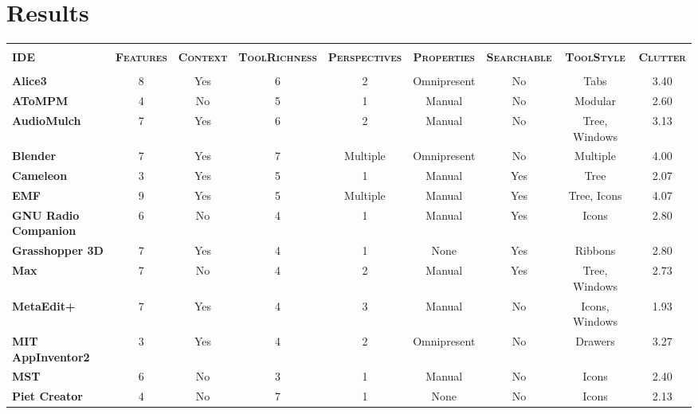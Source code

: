 \section{Results}
\label{sec:results}

\begin{table*}
	\centering
		{\scriptsize
		\begin{tabular}{l|cccccccc}
		  \hline\hline
		  &&&&&&&&		\\[-1.5ex]
      \textbf{IDE}
      & \textbf{\scshape Features}
      & \textbf{\scshape Context}
      & \textbf{\scshape ToolRichness}
      & \textbf{\scshape Perspectives}
      & \textbf{\scshape Properties}
      & \textbf{\scshape Searchable}
      & \textbf{\scshape ToolStyle}
      & \textbf{\scshape Clutter}			\\[1ex]
		  \hline
		  &&&&&&&&		\\[-1.5ex]
      \textbf{Alice3} & 8	& Yes	& 6	& 2	& Omnipresent	& No	& Tabs	& 3.40			\\[1ex]
      \textbf{AToMPM}    & 4	& No	& 5	& 1	& Manual	& No	& Modular	& 2.60			\\[1ex]
      \textbf{AudioMulch}    & 7	& Yes	& 6	& 2	& Manual	& No	& Tree, Windows	& 3.13			\\[1ex]
      \textbf{Blender}    & 7	& Yes	& 7	& Multiple	& Omnipresent	& No	& Multiple	& 4.00			\\[1ex]
      \textbf{Cameleon}    & 3	& Yes	& 5	& 1	& Manual	& Yes	& Tree	& 2.07			\\[1ex]
      \textbf{EMF}    & 9	& Yes	& 5	& Multiple	& Manual	& Yes	& Tree, Icons	& 4.07			\\[1ex]
      \textbf{GNU Radio Companion}    & 6	& No	& 4	& 1	& Manual	& Yes	& Icons	& 2.80			\\[1ex]
      \textbf{Grasshopper 3D}    & 7	& Yes	& 4	& 1	& None	& Yes	& Ribbons	& 2.80			\\[1ex]
      \textbf{Max}    & 7	& No	& 4	& 2	& Manual	& Yes	& Tree, Windows	& 2.73			\\[1ex]
      \textbf{MetaEdit+}    & 7	& Yes	& 4	& 3	& Manual	& No	& Icons, Windows	& 1.93			\\[1ex]
      \textbf{MIT AppInventor2}    & 3	& Yes	& 4	& 2	& Omnipresent	& No	& Drawers	& 3.27			\\[1ex]
      \textbf{MST}    & 6	& No	& 3	& 1	& Manual	& No	& Icons	& 2.40			\\[1ex]
      \textbf{Piet Creator}    & 4	& No	& 7	& 1	& None	& No	& Icons	& 2.13			\\[1ex]

\end{tabular}}
\end{table*}
